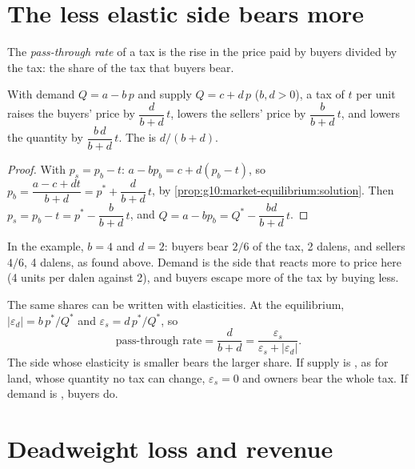 \section{The less elastic side bears more}\label{sec:g10:tax-incidence:shares}

\begin{definition}\label{def:g10:tax-incidence:pass-through}
The \emph{pass-through rate} of a tax is the rise in the price paid by buyers divided by the tax: the share of the tax that buyers bear.
\end{definition}

\begin{proposition}\label{prop:g10:tax-incidence:shares}
With demand $Q = a - b\,p$ and supply $Q = c + d\,p$ ($b, d > 0$), a tax of $t$ per unit raises the buyers' price by $\dfrac{d}{b + d}\,t$, lowers the sellers'
price by $\dfrac{b}{b + d}\,t$, and lowers the quantity by $\dfrac{b\,d}{b + d}\,t$. The  is $d/(b + d)$.
\end{proposition}
\begin{proof}
With $p_s = p_b - t$: $a - bp_b = c + d(p_b - t)$, so $p_b = \dfrac{a - c + dt}{b + d} = p^* + \dfrac{d}{b + d}\,t$, by \cref{prop:g10:market-equilibrium:solution}.
Then $p_s = p_b - t = p^* - \dfrac{b}{b + d}\,t$, and $Q = a - bp_b = Q^* - \dfrac{bd}{b + d}\,t$.
\end{proof}

In the example, $b = 4$ and $d = 2$: buyers bear $2/6$ of the tax, 2 dalens, and sellers $4/6$, 4 dalens, as found above. Demand is the side that reacts more
to price here (4 units per dalen against 2), and buyers escape more of the tax by buying less.

The same shares can be written with elasticities. At the equilibrium, $|\varepsilon_d| = b\,p^*/Q^*$ and $\varepsilon_s = d\,p^*/Q^*$, so
\[
  \text{pass-through rate} = \frac{d}{b + d} = \frac{\varepsilon_s}{\varepsilon_s + |\varepsilon_d|}.
\]
The side whose elasticity is smaller bears the larger share. If supply is , as for land, whose quantity no tax can change, $\varepsilon_s = 0$ and
owners bear the whole tax. If demand is , buyers do.

\section{Deadweight loss and revenue}\label{sec:g10:tax-incidence:dwl}

